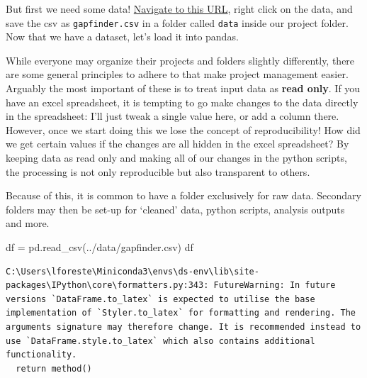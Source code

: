 \documentclass[
  letterpaper,
  DIV=11,
  numbers=noendperiod]{scrreprt}
\newenvironment{Shaded}{\begin{snugshade}}{\end{snugshade}}
\newcommand{\NormalTok}[1]{\textcolor[rgb]{0.00,0.23,0.31}{#1}}
\newcommand{\OperatorTok}[1]{\textcolor[rgb]{0.37,0.37,0.37}{#1}}
\newcommand{\StringTok}[1]{\textcolor[rgb]{0.13,0.47,0.30}{#1}}
\begin{document}
But first we need some data!
\href{https://raw.githubusercontent.com/bcgov/ds-intro-to-python/main/data/gapfinder.csv}{Navigate
to this URL}, right click on the data, and save the csv as
\texttt{gapfinder.csv} in a folder called \texttt{data} inside our
project folder. Now that we have a dataset, let's load it into pandas.

\begin{tcolorbox}[enhanced jigsaw, rightrule=.15mm, opacitybacktitle=0.6, colback=white, toprule=.15mm, colframe=quarto-callout-tip-color-frame, bottomtitle=1mm, bottomrule=.15mm, arc=.35mm, coltitle=black, breakable, title=\textcolor{quarto-callout-tip-color}{\faLightbulb}\hspace{0.5em}{The Data Folder}, titlerule=0mm, opacityback=0, colbacktitle=quarto-callout-tip-color!10!white, left=2mm, toptitle=1mm, leftrule=.75mm]
While everyone may organize their projects and folders slightly
differently, there are some general principles to adhere to that make
project management easier. Arguably the most important of these is to
treat input data as \textbf{read only}. If you have an excel
spreadsheet, it is tempting to go make changes to the data directly in
the spreadsheet: I'll just tweak a single value here, or add a column
there. However, once we start doing this we lose the concept of
reproducibility! How did we get certain values if the changes are all
hidden in the excel spreadsheet? By keeping data as read only and making
all of our changes in the python scripts, the processing is not only
reproducible but also transparent to others.

Because of this, it is common to have a folder exclusively for raw data.
Secondary folders may then be set-up for `cleaned' data, python scripts,
analysis outputs and more.
\end{tcolorbox}

\begin{Shaded}
\begin{Highlighting}[]
\NormalTok{df }\OperatorTok{=}\NormalTok{ pd.read\_csv(}\StringTok{\textquotesingle{}../data/gapfinder.csv\textquotesingle{}}\NormalTok{)}
\NormalTok{df}
\end{Highlighting}
\end{Shaded}

\begin{verbatim}
C:\Users\lforeste\Miniconda3\envs\ds-env\lib\site-packages\IPython\core\formatters.py:343: FutureWarning: In future versions `DataFrame.to_latex` is expected to utilise the base implementation of `Styler.to_latex` for formatting and rendering. The arguments signature may therefore change. It is recommended instead to use `DataFrame.style.to_latex` which also contains additional functionality.
  return method()
\end{verbatim}
\end{document}
